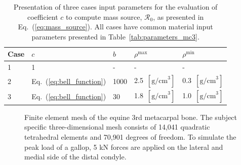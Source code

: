 \documentclass[review]{elsarticle}
\numberwithin{equation}{section}
\begin{document}
\begin{table}[h]
	\centering
	\begin{tabular}{lllll}
		\hline
		Case                  & $c$              				       & $b$     &$\rho^\mathrm{max}$               &$\rho^\mathrm{min}$ \\ \hline
		1                     & 1              								 & -       & -                                & -\\
		2                     & Eq.~(\ref{eq:bell_function})   & 1000    & 2.5~$[{\text{g/cm}}^3]$          & 0.3~$[{\text{g/cm}}^3]$\\
		3                     & Eq.~(\ref{eq:bell_function})   & 30      & 1.8~$[{\text{g/cm}}^3]$          &1.0~$[{\text{g/cm}}^3]$ \\
		\hline
	\end{tabular} 
	\caption{Presentation of three cases input parameters for the evaluation of coefficient $c$ to compute mass source, $\mathcal{R}_0$, as presented in Eq.~(\ref{eq:mass_source}). All cases have common material input parameters presented in Table~\ref{tab:parameters_mc3}.}
	\label{tab:three_cases}
\end{table}

\begin{figure}[h]
	\begin{center}
		\caption{Finite element mesh of the equine 3rd metacarpal bone. The subject specific three-dimensional mesh consists of 14,041 quadratic tetrahedral elements and 70,901 degrees of freedom. To simulate the peak load of a gallop, 5 kN forces are applied on the lateral and medial side of the distal condyle.}
		\label{fig:mc3_BC}
	\end{center}
\end{figure}
\end{document}

